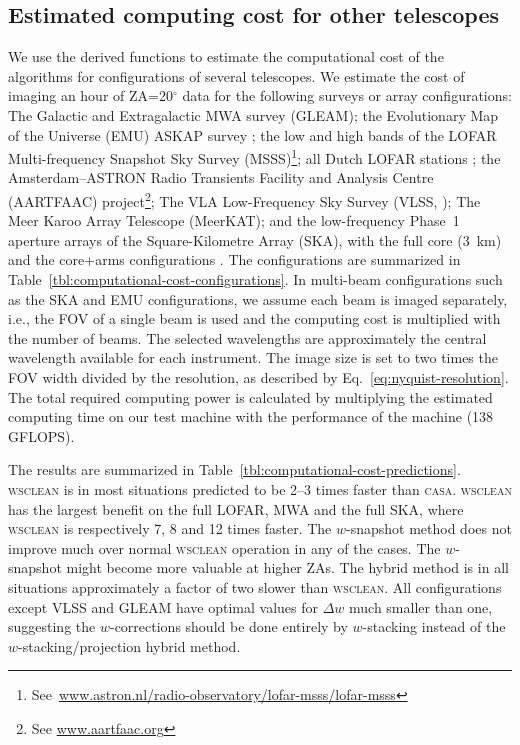 \documentclass[useAMS,usenatbib]{mn2e}
\newcommand{\degree}{\ensuremath{^{\circ}}\xspace}
\begin{document}
\subsection{Estimated computing cost for other telescopes} \label{sec:application-to-nonmwa}
We use the derived functions to estimate the computational cost of the algorithms for configurations of several telescopes. We estimate the cost of imaging an hour of ZA=20\degree data for the following surveys or array configurations: The Galactic and Extragalactic MWA survey (GLEAM); the Evolutionary Map of the Universe (EMU) ASKAP survey \citep{emu-norris-2011}; the low and high bands of the LOFAR Multi-frequency Snapshot Sky Survey (MSSS)\footnote{See~\href{https://www.astron.nl/radio-observatory/lofar-msss/lofar-msss}{www.astron.nl/radio-observatory/lofar-msss/lofar-msss}}; all Dutch LOFAR stations \citep{lofar-2013}; the Amsterdam--ASTRON Radio Transients Facility and Analysis Centre (AARTFAAC) project\footnote{See \href{http://www.aartfaac.org}{www.aartfaac.org}}; The VLA Low-Frequency Sky Survey (VLSS, \citealt{vlss-2007}); The Meer Karoo Array Telescope (MeerKAT); and the low-frequency Phase~1 aperture arrays of the Square-Kilometre Array (SKA), with the full core (3~km) and the core+arms configurations \citep{ska-phase1-2013}. The configurations are summarized in Table~\ref{tbl:computational-cost-configurations}. In multi-beam configurations such as the SKA and EMU configurations, we assume each beam is imaged separately, i.e., the FOV of a single beam is used and the computing cost is multiplied with the number of beams. The selected wavelengths 
are approximately the central wavelength available for each instrument. The image size is set to two times the FOV width divided by the resolution, as described by Eq.~\ref{eq:nyquist-resolution}. The total required computing power is calculated by multiplying the estimated computing time on our test machine with the performance of the machine (138 GFLOPS).

The results are summarized in Table~\ref{tbl:computational-cost-predictions}. \textsc{wsclean} is in most situations predicted to be 2--3 times faster than \textsc{casa}. \textsc{wsclean} has the largest benefit on the full LOFAR, MWA and the full SKA, where \textsc{wsclean} is respectively 7, 8 and 12 times faster. The $w$-snapshot method does not improve much over normal \textsc{wsclean} operation in any of the cases. The $w$-snapshot might become more valuable at higher ZAs. The hybrid method is in all situations approximately a factor of two slower than \textsc{wsclean}. All configurations except VLSS and GLEAM have optimal values for $\Delta w$ much smaller than one, suggesting the $w$-corrections should be done entirely by $w$-stacking instead of the $w$-stacking/projection hybrid method.
\end{document}
